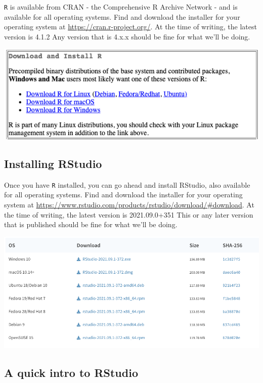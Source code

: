 \documentclass[
]{book}
\begin{document}
\texttt{R} is available from CRAN - the Comprehensive R Archive Network - and is available for all operating systems. Find and download the installer for your operating system at \url{https://cran.r-project.org/}. At the time of writing, the latest version is 4.1.2 Any version that is 4.x.x should be fine for what we'll be doing.

\includegraphics{images/Install-R_20220101.png}

\hypertarget{installing-rstudio}{%
\subsection*{Installing RStudio}\label{installing-rstudio}}

Once you have \texttt{R} installed, you can go ahead and install RStudio, also available for all operating systems. Find and download the installer for your operating system at \url{https://www.rstudio.com/products/rstudio/download/\#download}. At the time of writing, the latest version is 2021.09.0+351 This or any later version that is published should be fine for what we'll be doing.

\includegraphics{images/Install-RStudio_20220101.png}

\hypertarget{a-quick-intro-to-rstudio}{%
\subsection*{A quick intro to RStudio}\label{a-quick-intro-to-rstudio}}
\end{document}

